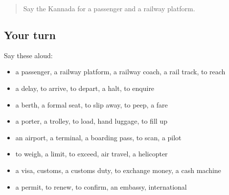 \label{lesson:KA-R440-review-433-440}



\begin{quote}
Say the Kannada for a passenger and a railway platform.
\end{quote}

\subsection*{Your turn}
Say these aloud:

\begin{itemize}
\raggedright
  \item a passenger, a railway platform, a railway coach, a rail track, to reach
  \item a delay, to arrive, to depart, a halt, to enquire
  \item a berth, a formal seat, to slip away, to peep, a fare
  \item a porter, a trolley, to load, hand luggage, to fill up
  \item an airport, a terminal, a boarding pass, to scan, a pilot
  \item to weigh, a limit, to exceed, air travel, a helicopter
  \item a visa, customs, a customs duty, to exchange money, a cash machine
  \item a permit, to renew, to confirm, an embassy, international
\end{itemize}

